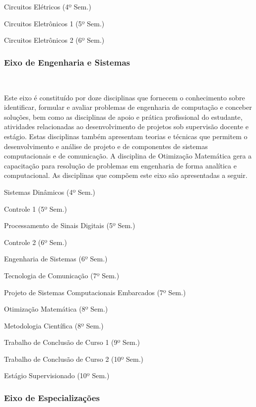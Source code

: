 \begin{compenum}
    \item Circuitos Elétricos (4º Sem.)
    \item Circuitos Eletrônicos 1 (5º Sem.)
    \item Circuitos Eletrônicos 2 (6º Sem.)
\end{compenum}

\subsubsection{Eixo de Engenharia e Sistemas}~\label{sec:E7}

Este eixo é constituído por doze disciplinas que fornecem o conhecimento sobre identificar, formular e avaliar problemas de engenharia de computação e conceber soluções, bem como as disciplinas de apoio e prática profissional do estudante, atividades relacionadas ao desenvolvimento de projetos sob supervisão docente e estágio. Estas disciplinas também apresentam teorias e técnicas que permitem o desenvolvimento e análise de projeto e de componentes de sistemas computacionais e de comunicação. A disciplina de Otimização Matemática gera a capacitação para resolução de problemas em engenharia de forma analítica e computacional. As disciplinas que compõem este eixo são apresentadas a seguir.

\begin{compenum}
    \item Sistemas Dinâmicos (4º Sem.)
    \item Controle 1 (5º Sem.)
    \item Processamento de Sinais Digitais (5º Sem.)
    \item Controle 2 (6º Sem.)
    \item Engenharia de Sistemas (6º Sem.)
    \item Tecnologia de Comunicação (7º Sem.)
    \item Projeto de Sistemas Computacionais Embarcados (7º Sem.)
    \item Otimização Matemática (8º Sem.)
    \item Metodologia Científica (8º Sem.)
    \item Trabalho de Conclusão de Curso 1 (9º Sem.)
    \item Trabalho de Conclusão de Curso 2 (10º Sem.)
    \item Estágio Supervisionado (10º Sem.)
\end{compenum}

\subsubsection{Eixo de Especializações }~\label{sec:E9}

